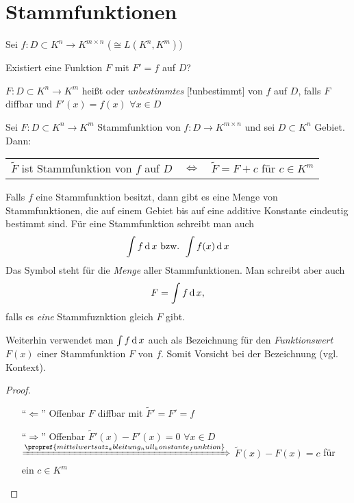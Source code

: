 \section{Stammfunktionen}  \setcounter{equation}{0}
Sei $f:D\subset K^n\to K^{m\times n}$ ($\cong L(K^n, K^m)$)

\begin{underlinedenvironment}[Frage]
	Existiert eine Funktion $F$ mit $F' = f$ auf $D$?
\end{underlinedenvironment}

\begin{*definition}
	$F: D\subset K^n\to K^m$ heißt  oder \emph{unbestimmtes} [!unbestimmt] von $f$ auf $D$, falls $F$ \gls{diffbar} und $F'(x) = f(x)$ $\forall x\in D$
\end{*definition}

\begin{proposition}
	Sei $F:D\subset K^n\to K^m$ Stammfunktion von $f:D\to K^{m\times n}$ und sei $D\subset K^n$ Gebiet. Dann:
	
	\begin{tabularx}{\linewidth}{X@{\ \ }c@{\ \ }X}
		\hfill$\tilde{F}$ ist Stammfunktion von $f$ auf $D$ & $\Leftrightarrow$ & $\tilde{F} = F + c$ für $c\in K^{m}$
	\end{tabularx}

	Falls $f$ eine Stammfunktion besitzt, dann gibt es eine Menge von Stammfunktionen, die auf einem Gebiet bis auf eine additive Konstante eindeutig bestimmt sind. Für eine Stammfunktion schreibt man auch \begin{align*}
		\int f \operatorname{d} x \text{ bzw. } \int f(x) \operatorname{d} x
	\end{align*}
	Das Symbol steht für die \emph{Menge} aller Stammfunktionen. Man schreibt aber auch \begin{align*}
		F = \int f \operatorname{d} x,
	\end{align*} falls es \emph{eine} Stammfuznktion gleich $F$ gibt.
	
	Weiterhin verwendet man $\int f\operatorname{d} x$ auch als Bezeichnung für den \emph{Funktionswert} $F(x)$ einer Stammfunktion $F$ von $f$. Somit Vorsicht bei der Bezeichnung (vgl. Kontext).
\end{proposition}

\begin{proof}
	 \hspace*{0pt}
	\begin{itemize}[topsep=\dimexpr -\baselineskip / 2\relax]
		\item["`$\Leftarrow$"'] Offenbar $F$ \gls{diffbar} mit $\tilde{F}' = F' = f$
		\item["`$\Rightarrow$"'] Offenbar $\tilde{F}'(x) - F'(x) = 0$ $\forall x\in D$ 
		$\xRightarrow{\propref{mittelwertsatz_ableitung_null_konstante_funktion}}$ $\tilde{F}(x) - F(x) = c$ für ein $c\in K^m$
	\end{itemize}
\end{proof}

